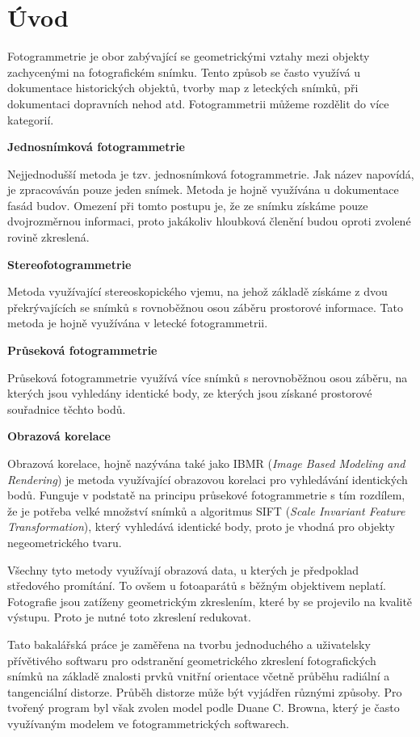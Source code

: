 \chapter{Úvod}
	Fotogrammetrie je obor zabývající se geometrickými vztahy mezi objekty zachycenými na fotografickém snímku. Tento způsob se často využívá u dokumentace historických objektů, tvorby map z leteckých snímků, při dokumentaci dopravních nehod atd. Fotogrammetrii můžeme rozdělit do více kategorií.
	
	\textbf{Jednosnímková fotogrammetrie}
	
	Nejjednodušší metoda je tzv. jednosnímková fotogrammetrie. Jak název napovídá, je zpracováván pouze jeden snímek. Metoda je hojně využívána u dokumentace fasád budov. Omezení při tomto postupu je, že ze snímku získáme pouze dvojrozměrnou informaci, proto jakákoliv hloubková členění budou oproti zvolené rovině zkreslená.
	
	\textbf{Stereofotogrammetrie}
	
	Metoda využívající stereoskopického vjemu, na jehož základě získáme z dvou překrývajících se snímků s rovnoběžnou osou záběru prostorové informace. Tato metoda je hojně využívána v letecké fotogrammetrii.

	\textbf{Průseková fotogrammetrie}
	
	Průseková fotogrammetrie využívá více snímků s nerovnoběžnou osou záběru, na kterých jsou vyhledány identické body, ze kterých jsou získané prostorové souřadnice těchto bodů.
	
	\textbf{Obrazová korelace}
	
	
	Obrazová korelace, hojně nazývána také jako IBMR (\textit{Image Based Modeling and Rendering}) je metoda využívající obrazovou korelaci pro vyhledávání identických bodů. Funguje v podstatě na principu průsekové fotogrammetrie s tím rozdílem, že je potřeba velké množství snímků a algoritmus SIFT (\textit{Scale Invariant Feature Transformation}), který vyhledává identické body, proto je vhodná pro objekty negeometrického tvaru.
	
	Všechny tyto metody využívají obrazová data, u kterých je předpoklad středového promítání. To ovšem u fotoaparátů s běžným objektivem neplatí. Fotografie jsou zatíženy geometrickým zkreslením, které by se projevilo na kvalitě výstupu. Proto je nutné toto zkreslení redukovat.

	Tato bakalářská práce je zaměřena na tvorbu jednoduchého a uživatelsky přívětivého softwaru pro odstranění geometrického zkreslení fotografických snímků na základě znalosti prvků vnitřní orientace včetně průběhu radiální a tangenciální distorze. Průběh distorze může být vyjádřen různými způsoby. Pro tvořený program byl však zvolen model podle Duane C. Browna, který je často využívaným modelem ve fotogrammetrických softwarech.
	
